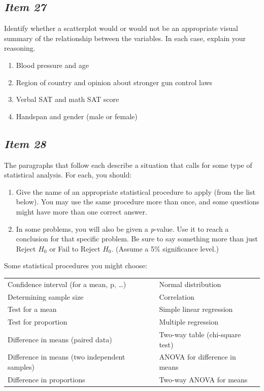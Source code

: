 \subsection{\textbf{\textit{Item 27}}}
Identify whether a scatterplot would or would not be an appropriate visual summary of the relationship between the variables.  In each case, explain your reasoning.  
\begin{enumerate}[leftmargin=1cm, itemsep=.2em]
\item Blood pressure and age
\item Region of country and opinion about stronger gun control laws
\item Verbal SAT and math SAT score
\item Handspan and gender (male or female)
\end{enumerate}

\subsection{\textbf{\textit{Item 28}}}
The paragraphs that follow each describe a situation that calls for some type of statistical analysis.  For each, you should:
\renewcommand{\labelenumi}{\arabic{enumi}.}
\begin{enumerate}[leftmargin=1cm, itemsep=.2em]
\item Give the name of an appropriate statistical procedure to apply (from the list below). You may use the same procedure more than once, and some questions might have more than one correct answer.
\item In some problems, you will also be given a \textit{p}-value. Use it to reach a conclusion for that specific problem.  Be sure to say something more than just Reject $H_0$ or Fail to Reject $H_0$. (Assume a 5\% significance level.) 
\end{enumerate}

Some statistical procedures you might choose:
\begin{table}[!ht]
\begin{center}
\begin{tabular}{ll}
\hline
Confidence interval (for a mean, p, \ldots) & Normal distribution\\
Determining sample size	& Correlation\\
Test for a mean	 & Simple linear regression\\
Test for proportion & Multiple regression\\
Difference in means (paired data) & Two-way table (chi-square test)\\
Difference in means (two independent samples) & ANOVA for difference in means\\
Difference in proportions & Two-way ANOVA for means\\
\hline
\end{tabular}
\end{center}
\end{table}

